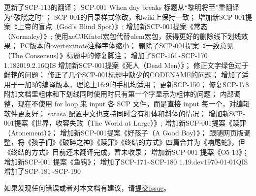 \begin{versionhistory}
{    更新了SCP-113的翻译；
    SCP-001 When day breaks 标题从“黎明将至”重翻译为“破晓之时”；
    SCP-001的目录样式修改，和wiki上保持一致；
    增加新SCP-001提案《上帝的盲点（God's Blind Spot）》;
    增加新SCP-001提案《常态（Normalcy）》;
    使用xeCJKfntef宏包代替ulem宏包，获得更好的删除线下划线效果；
    PC版本的overtextnote注释字体缩小；
    删除了SCP-001提案《一致意见（The Consensus）》标题中的修复脚注；
    增加了SCP-161\textasciitilde SCP-170
}
\vhEntry
{1.18}{2019.2.16}{QIS}{
    增加新SCP-001提案《死人（Dead Men）》；
    修正文字绿色过于鲜艳的问题；
    修正了几个SCP-001标题中缺少的CODENAME的问题；
    增加了适用于一加3的编译版本，理论上16:9的手机均适用；
    更新SCP-150；
    修复SCP-178附加文档里粗体和下划线同时使用时只有第一个字显示为粗体的问题；
    内部调整，现在不使用 for loop 来 input 各 SCP 文件，而是直接 input 每一个，对编辑软件更友好；
    sarasa 配置中文也支持同时含有粗体和斜体的情况；
    增加新SCP-001提案《世界，收容失败（The World at Large）》;
    增加新SCP-001提案《赎罪（Atonement）》；
    增加新SCP-001提案《好孩子（A Good Boy）》；
    跟随网页版调整，将《孩子们》《破碎之神》《赎罪》《终结的方式》四篇合并为《响尾蛇》，但《终结的方式》目前还未翻译完成，暂未收录；
    增加新SCP-001 提案《O5-13》；
    增加新SCP-001 提案《鱼钩》；
    增加了SCP-171\textasciitilde SCP-180
}
\vhEntry
{1.19.dev}{\today}{QIS}{
    增加了SCP-181\textasciitilde SCP-190
}
\end{versionhistory}

如果发现任何错误或者对本文档有建议，请\href{https://github.com/7sDream/scp-pdf/issues}{提交Issue}。
